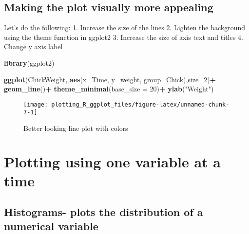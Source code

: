\documentclass[
]{book}
\newenvironment{Shaded}{\begin{snugshade}}{\end{snugshade}}
\newcommand{\DataTypeTok}[1]{\textcolor[rgb]{0.13,0.29,0.53}{#1}}
\newcommand{\DecValTok}[1]{\textcolor[rgb]{0.00,0.00,0.81}{#1}}
\newcommand{\KeywordTok}[1]{\textcolor[rgb]{0.13,0.29,0.53}{\textbf{#1}}}
\newcommand{\NormalTok}[1]{#1}
\newcommand{\OperatorTok}[1]{\textcolor[rgb]{0.81,0.36,0.00}{\textbf{#1}}}
\newcommand{\StringTok}[1]{\textcolor[rgb]{0.31,0.60,0.02}{#1}}
\begin{document}
\hypertarget{making-the-plot-visually-more-appealing}{%
\section{Making the plot visually more appealing}\label{making-the-plot-visually-more-appealing}}

Let's do the following:
1. Increase the size of the lines
2. Lighten the background using the theme function in ggplot2
3. Increase the size of axis text and titles
4. Change y axis label

\begin{Shaded}
\begin{Highlighting}[]
\KeywordTok{library}\NormalTok{(ggplot2)}

\KeywordTok{ggplot}\NormalTok{(ChickWeight, }\KeywordTok{aes}\NormalTok{(}\DataTypeTok{x=}\NormalTok{Time, }\DataTypeTok{y=}\NormalTok{weight, }\DataTypeTok{group=}\NormalTok{Chick),}\DataTypeTok{size=}\DecValTok{2}\NormalTok{)}\OperatorTok{+}
\StringTok{  }\KeywordTok{geom_line}\NormalTok{()}\OperatorTok{+}
\StringTok{  }\KeywordTok{theme_minimal}\NormalTok{(}\DataTypeTok{base_size =} \DecValTok{20}\NormalTok{)}\OperatorTok{+}
\StringTok{  }\KeywordTok{ylab}\NormalTok{(}\StringTok{"Weight"}\NormalTok{)}
\end{Highlighting}
\end{Shaded}

\begin{figure}

{\centering \texttt{[image: plotting\_R\_ggplot\_files/figure-latex/unnamed-chunk-7-1]} 

}

\caption{Better looking line plot with colors}\label{fig:unnamed-chunk-7}
\end{figure}

\hypertarget{plotting-using-one-variable-at-a-time}{%
\chapter{Plotting using one variable at a time}\label{plotting-using-one-variable-at-a-time}}

\hypertarget{histograms--plots-the-distribution-of-a-numerical-variable}{%
\section{Histograms- plots the distribution of a numerical variable}\label{histograms--plots-the-distribution-of-a-numerical-variable}}
\end{document}

